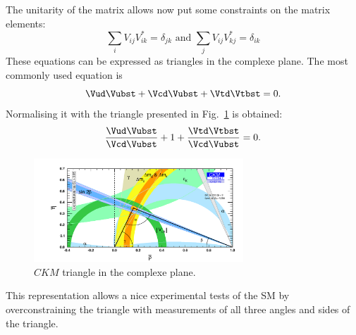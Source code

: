 The unitarity of the matrix allows now put some constraints on the matrix elements:
\begin{equation}
\sum_{i} V_{ij}V_{ik}^{*} = \delta_{jk}\text{ and } \sum_{j} V_{ij}V_{kj}^{*} = \delta_{ik}
\end{equation}
These equations can be expressed as triangles in the complexe plane. The most commonly used equation is
\begin{equation}
\Vud\Vubst + \Vcd\Vubst + \Vtd\Vtbst = 0.
\end{equation}
Normalising it with \Vcd\Vcbst the triangle presented in Fig.~\ref{fig:ckmtheory} is obtained:
\begin{equation}
\frac{\Vud\Vubst}{\Vcd\Vubst} + 1 + \frac{\Vtd\Vtbst}{\Vcd\Vubst} = 0.
\end{equation}
\begin{figure}[htbp]
 	\centering
	\includegraphics[width=0.7\textwidth]{02theory/figs/ckm_triangle.pdf}
	\caption{$CKM$ triangle in the complexe plane.}
\label{fig:ckmtheory}
\end{figure}
This representation allows a nice experimental tests of the \ac{SM} by overconstraining the triangle with measurements of all three
angles and sides of the triangle.
